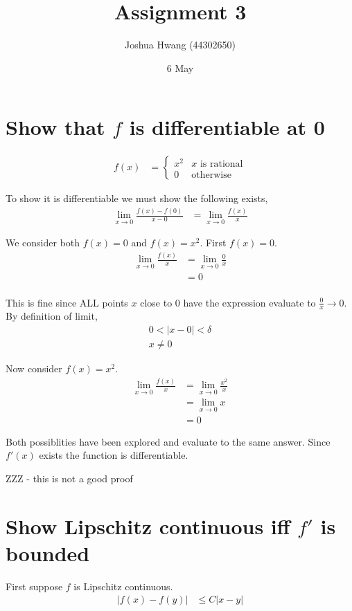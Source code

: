 \documentclass{article}
\title{Assignment 3}
\author{Joshua Hwang (44302650)}
\date{6 May}
\begin{document}
\maketitle

\section{Show that $f$ is differentiable at 0}
\begin{align*}
    f(x)
    &=
    \begin{cases}
        x^2 & \text{$x$ is rational} \\
        0 & \text{otherwise}
    \end{cases}
\end{align*}

To show it is differentiable we must show the following exists,
\begin{align*}
    \lim_{x \to 0} \frac{f(x) - f(0)}{x - 0}
    &= \lim_{x \to 0} \frac{f(x)}{x}
\end{align*}

We consider both $f(x) = 0$ and $f(x) = x^2$. First $f(x) = 0$.
\begin{align*}
    \lim_{x \to 0} \frac{f(x)}{x} &= \lim_{x \to 0} \frac{0}{x} \\
    &= 0 \\
\end{align*}

This is fine since ALL points $x$ close to 0 have the expression evaluate to
$\frac{0}{x} \to 0$. By definition of limit,
\begin{align*}
0 < |x - 0| < \delta \\
x \neq 0
\end{align*}

Now consider $f(x) = x^2$.
\begin{align*}
    \lim_{x \to 0} \frac{f(x)}{x} &= \lim_{x \to 0} \frac{x^2}{x} \\
    &= \lim_{x \to 0} x \\
    &=  0
\end{align*}

Both possiblities have been explored and evaluate to the same answer. Since
$f'(x)$ exists the function is differentiable.

ZZZ - this is not a good proof

\section{Show Lipschitz continuous iff $f'$ is bounded}
First suppose $f$ is Lipschitz continuous.
\begin{align*}
    |f(x) - f(y)| &\leq C|x - y|
\end{align*}
\end{document}

